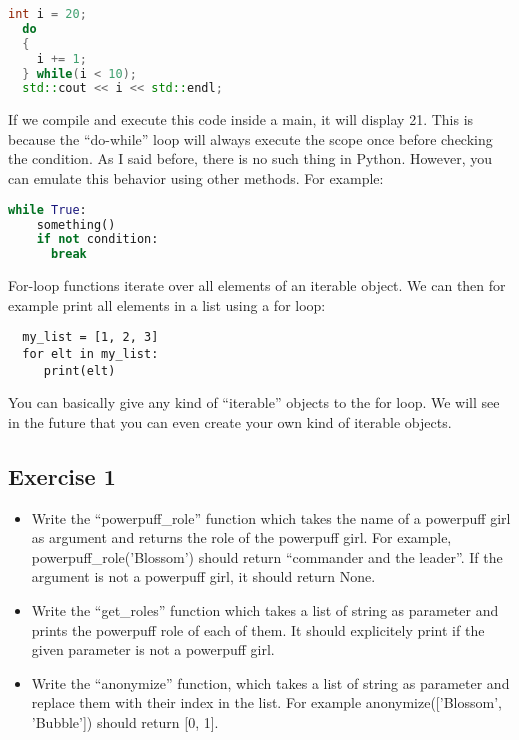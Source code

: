 \begin{lstlisting}[language=C++]
  int i = 20;
  do
  {
    i += 1;
  } while(i < 10);
  std::cout << i << std::endl;
\end{lstlisting}

If we compile and execute this code inside a main, it will display 21. This is because
the ``do-while'' loop will always execute the scope once before checking the condition.
As I said before, there is no such thing in Python. However, you can emulate this behavior
using other methods. For example:

\begin{lstlisting}[language=python]
  while True:
    something()
    if not condition:
      break
\end{lstlisting}

For-loop functions iterate over all elements of an iterable object. We can then for example
print all elements in a list using a for loop:

\begin{lstlisting}
  my_list = [1, 2, 3]
  for elt in my_list:
     print(elt)
\end{lstlisting}

You can basically give any kind of ``iterable'' objects to the for loop. We will see in the future
that you can even create your own kind of iterable objects.

\subsection{Exercise 1}

\begin{itemize}
\item Write the ``powerpuff\_role'' function which takes the name of a powerpuff girl as argument
  and returns the role of the powerpuff girl. For example, powerpuff\_role('Blossom') should return
  ``commander and the leader''. If the argument is not a powerpuff girl, it should return None.
\item Write the ``get\_roles'' function which takes a list of string as parameter and prints the powerpuff role
  of each of them. It should explicitely print if the given parameter is not a powerpuff girl.
\item Write the ``anonymize'' function, which takes a list of string as parameter and replace them with their index
  in the list. For example anonymize(['Blossom', 'Bubble']) should return [0, 1].
\end{itemize}

